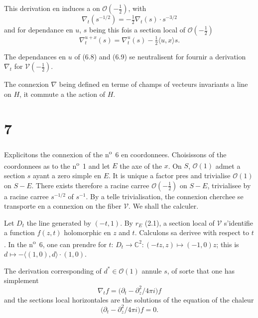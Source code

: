 \documentclass[12pt,a4paper]{article}
\theoremstyle{plain}
\theoremstyle{definition}
\theoremstyle{remark}
\begin{document}
This derivation en induces a on $\mathcal{O}(-\frac{1}{2})$, with
\[\nabla_t(s^{-1/2}) = -\tfrac{1}{2}\nabla_t(s) \cdot s^{-3/2}\]
and for dependance en $u$, $s$ being this fois a section local of $\mathcal{O}(-\frac{1}{2})$
\begin{equation}\label{eq:6.9}
\nabla_t^{u+x}(s) = \nabla_t^u(s) - \tfrac{1}{2}\langle u, x \rangle s.\tag{6.9}
\end{equation}

The dependances en $u$ of (6.8) and (6.9) se neutralisent for fournir a derivation $\nabla_t$ for $\mathscr{V}(-\frac{1}{2})$.

The connexion $\nabla$ being defined en terme of champs of vecteurs invariants a line on $H$, it commute a the action of $H$.

\section*{7}

Explicitons the connexion of the n\textsuperscript{o}~6 en coordonnees. Choisissons of the coordonnees as to the n\textsuperscript{o}~1 and let $E$ the axe of the $x$. On $S$, $\mathcal{O}(1)$ admet a section $s$ ayant a zero simple en $E$. It is unique a factor pres and trivialise $\mathcal{O}(1)$ on $S - E$. There exists therefore a racine carree $\mathcal{O}(-\frac{1}{2})$ on $S - E$, trivialisee by a racine carree $s^{-1/2}$ of $s^{-1}$. By a telle trivialisation, the connexion cherchee se transporte en a connexion on the fiber $\mathscr{V}$. We shall the calculer.

Let $D_t$ the line generated by $(-t, 1)$. By $r_E$ (2.1), a section local of $\mathscr{V}$ s'identifie a function $f(z, t)$ holomorphic en $z$ and $t$. Calculons sa derivee with respect to $t$. In the n\textsuperscript{o}~6, one can prendre for $t$: $D_t \to \mathbb{C}^2 : (-tz, z) \mapsto (-1, 0)z$; this is $d \mapsto -\langle(1, 0), d\rangle \cdot (1, 0)$.

The derivation corresponding of $d^* \in \mathcal{O}(1)$ annule $s$, of sorte that one has simplement
\begin{equation}\label{eq:7.1}
\nabla_t f = \bigl(\partial_t - \partial_z^2/4\pi i\bigr)f\tag{7.1}
\end{equation}
and the sections local horizontales are the solutions of the equation of the chaleur
\begin{equation}\label{eq:7.2}
\bigl(\partial_t - \partial_z^2/4\pi i\bigr)f = 0.\tag{7.2}
\end{equation}
\end{document}
